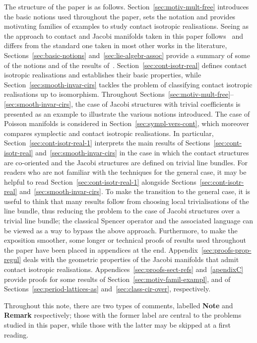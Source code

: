 \documentclass[pdftex]{sigma}
\numberwithin{equation}{section}
\begin{document}
 The structure of the paper is as follows. Section~\ref{sec:motiv-mult-free} introduces the basic notions used throughout the paper, sets the notation and provides motivating families of examples to study contact isotropic realisations. Seeing as the approach to contact and Jacobi manifolds taken in this paper follows~\cite{Maria-Crainic} and dif\/fers from the standard one taken in most other works in the literature, Sections~\ref{sec:basic-notions} and~\ref{sec:lie-algebr-assoc} provide a summary of some of the notions and of the results of~\cite{Maria-Crainic}. Section~\ref{sec:cont-isotr-real} def\/ines contact isotropic realisations and establishes their basic properties, while Section~\ref{sec:smooth-invar-cirs} tackles the problem of classifying contact isotropic realisations up to isomorphism. Throughout Sections~\ref{sec:motiv-mult-free}--\ref{sec:smooth-invar-cirs}, the case of Jacobi structures with trivial coef\/f\/icients is presented as an example to illustrate the various notions introduced. The case of Poisson manifolds is considered in Section~\ref{sec:sympl-vers-cont}, which moreover compares symplectic and contact isotropic realisations. In particular, Section~\ref{sec:cont-isotr-real-1} interprets the main results of Sections~\ref{sec:cont-isotr-real} and~\ref{sec:smooth-invar-cirs} in the case in which the contact structures are co-oriented and the Jacobi structures are def\/ined on trivial line bundles. For readers who are not familiar with the techniques for the general case, it may be helpful to read Section~\ref{sec:cont-isotr-real-1} alongside Sections~\ref{sec:cont-isotr-real} and~\ref{sec:smooth-invar-cirs}. To make the transition to the general case, it is useful to think that many results follow from choosing local trivialisations of the line bundle, thus reducing the problem to the case of Jacobi structures over a trivial line bundle; the classical Spencer operator and the associated language can be viewed as a way to bypass the above approach. Furthermore, to make the exposition smoother, some longer or technical proofs of results used throughout the paper have been placed in appendices at the end. Appendix~\ref{sec:proofs-prop-regul} deals with the geometric properties of the Jacobi manifolds that admit contact isotropic realisations. Appendices~\ref{sec:proofs-sect-refs} and~\ref{apendixC} provide proofs for some results of Section~\ref{sec:motiv-famil-exampl}, and of Sections~\ref{sec:period-lattices-as} and~\ref{sec:class-cir-over}, respectively.

Throughout this note, there are two types of comments, labelled {\bf Note} and {\bf Remark} respectively; those with the former label are central to the problems studied in this paper, while those with the latter may be skipped at a f\/irst reading.
\end{document}
